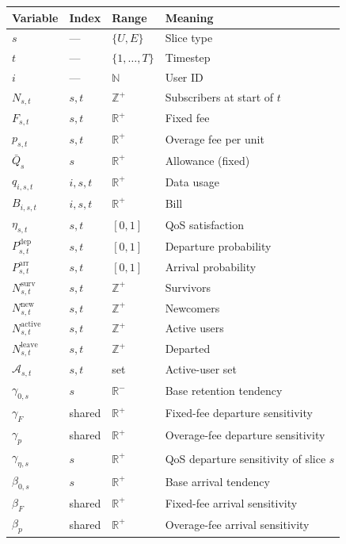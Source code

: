 \documentclass[11pt]{article}
\begin{document}
\small
\begin{longtable}{@{}llll@{}}
\toprule
Variable & Index & Range & Meaning \\
\midrule
\endhead
$s$ & --- & $\{U,E\}$ & Slice type \\
$t$ & --- & $\{1,\ldots,T\}$ & Timestep \\
$i$ & --- & $\mathbb{N}$ & User ID \\
$N_{s,t}$ & $s,t$ & $\mathbb{Z}^{+}$ & Subscribers at start of $t$ \\
$F_{s,t}$ & $s,t$ & $\mathbb{R}^{+}$ & Fixed fee \\
$p_{s,t}$ & $s,t$ & $\mathbb{R}^{+}$ & Overage fee per unit \\
$\bar{Q}_s$ & $s$ & $\mathbb{R}^{+}$ & Allowance (fixed) \\
$q_{i,s,t}$ & $i,s,t$ & $\mathbb{R}^{+}$ & Data usage \\
$B_{i,s,t}$ & $i,s,t$ & $\mathbb{R}^{+}$ & Bill \\
$\eta_{s,t}$ & $s,t$ & $[0,1]$ & QoS satisfaction \\
$P_{s,t}^{\mathrm{dep}}$ & $s,t$ & $[0,1]$ & Departure probability \\
$P_{s,t}^{\mathrm{arr}}$ & $s,t$ & $[0,1]$ & Arrival probability \\
$N_{s,t}^{\mathrm{surv}}$ & $s,t$ & $\mathbb{Z}^{+}$ & Survivors \\
$N_{s,t}^{\mathrm{new}}$ & $s,t$ & $\mathbb{Z}^{+}$ & Newcomers \\
$N_{s,t}^{\mathrm{active}}$ & $s,t$ & $\mathbb{Z}^{+}$ & Active users \\
$N_{s,t}^{\mathrm{leave}}$ & $s,t$ & $\mathbb{Z}^{+}$ & Departed \\
$\mathcal{A}_{s,t}$ & $s,t$ & set & Active-user set \\
$\gamma_{0,s}$ & $s$ & $\mathbb{R}^{-}$ & Base retention tendency \\
$\gamma_F$ & shared & $\mathbb{R}^{+}$ & Fixed-fee departure sensitivity \\
$\gamma_p$ & shared & $\mathbb{R}^{+}$ & Overage-fee departure sensitivity \\
$\gamma_{\eta,s}$ & $s$ & $\mathbb{R}^{+}$ & QoS departure sensitivity of slice $s$ \\
$\beta_{0,s}$ & $s$ & $\mathbb{R}^{+}$ & Base arrival tendency \\
$\beta_F$ & shared & $\mathbb{R}^{+}$ & Fixed-fee arrival sensitivity \\
$\beta_p$ & shared & $\mathbb{R}^{+}$ & Overage-fee arrival sensitivity \\

\end{longtable}
\end{document}
